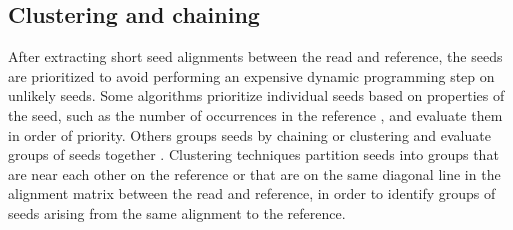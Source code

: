 \documentclass[11pt]{ucscthesis}
\begin{document}



\subsection{Clustering and chaining}

After extracting short seed alignments between the read and reference, the seeds are prioritized to avoid performing an expensive dynamic programming step on unlikely seeds.
Some algorithms prioritize individual seeds based on properties of the seed, such as the number of occurrences in the reference  \cite{langmead_bowtie2_2012}, and evaluate them in order of priority.
Others groups seeds by chaining or clustering and evaluate groups of seeds together \cite{li_bwa_mem_2013,li_minimap2_2018,lee_mosaik_2014,jain_mashmap_2018}.
Clustering techniques partition seeds into groups that are near each other on the reference or that are on the same diagonal line in the alignment matrix between the read and reference, in order to identify groups of seeds arising from the same alignment to the reference.
\end{document}
